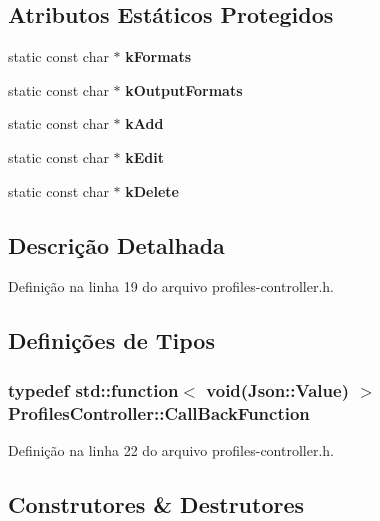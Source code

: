 \subsection*{Atributos Estáticos Protegidos}
\begin{DoxyCompactItemize}
\item 
static const char $\ast$ {\bf k\+Formats}
\item 
static const char $\ast$ {\bf k\+Output\+Formats}
\item 
static const char $\ast$ {\bf k\+Add}
\item 
static const char $\ast$ {\bf k\+Edit}
\item 
static const char $\ast$ {\bf k\+Delete}
\end{DoxyCompactItemize}


\subsection{Descrição Detalhada}


Definição na linha 19 do arquivo profiles-\/controller.\+h.



\subsection{Definições de Tipos}
\subsubsection[{Call\+Back\+Function}]{\setlength{\rightskip}{0pt plus 5cm}typedef std\+::function$<$ void(Json\+::\+Value) $>$ {\bf Profiles\+Controller\+::\+Call\+Back\+Function}}\label{class_profiles_controller_a6586f30a2b9648eaf4780c8ed4c9f7c8}


Definição na linha 22 do arquivo profiles-\/controller.\+h.



\subsection{Construtores \& Destrutores}

